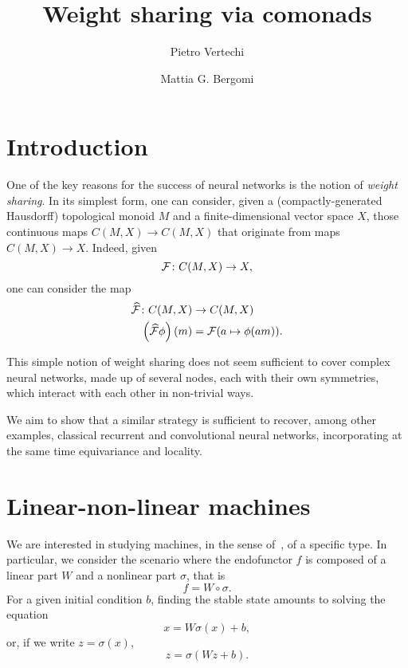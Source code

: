 \documentclass[12pt]{article}
\title{Weight sharing via comonads}
\author{
    Pietro Vertechi \and Mattia G. Bergomi
}
\date{}
\begin{document}
\maketitle
\begin{abstract}
\end{abstract}

\section{Introduction}

One of the key reasons for the success of neural networks is the notion of {\em weight sharing}. In its simplest form, one can consider, given a (compactly-generated Hausdorff) topological monoid $M$ and a finite-dimensional vector space $X$, those continuous maps $C(M, X) \rightarrow C(M, X)$ that originate from maps $C(M, X) \rightarrow X$. Indeed, given
\begin{equation*}
    {\cal F} \colon C(M, X) \rightarrow X,
\end{equation*}
one can consider the map
\begin{align*}
    \widehat{\cal F} \colon C(M, X)       & \rightarrow C(M, X)              \\
    \left(\widehat{\cal F}\phi\right)(m) & = {\cal F}(a \mapsto \phi(am)).
\end{align*}

This simple notion of weight sharing does not seem sufficient to cover complex neural networks, made up of several nodes, each with their own symmetries, which interact with each other in non-trivial ways.

We aim to show that a similar strategy is sufficient to recover, among other examples, classical recurrent and convolutional neural networks, incorporating at the same time equivariance and locality.

\section{Linear-non-linear machines}

We are interested in studying machines, in the sense of~\cite{2020arXiv200702777V}, of a specific type. In particular, we consider the scenario where the endofunctor $f$ is composed of a linear part $W$ and a nonlinear part $\sigma$, that is
\begin{equation*}
    f = W\circ \sigma.
\end{equation*}
For a given initial condition $b$, finding the stable state amounts to solving the equation
\begin{equation*}
    x = W\sigma(x) + b,
\end{equation*}
or, if we write $z = \sigma(x)$,
\begin{equation*}
    z = \sigma(Wz + b).
\end{equation*}
\end{document}
